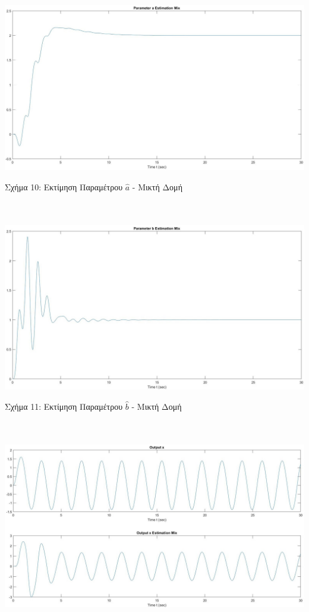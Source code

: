 \documentclass[12pt]{article}
\begin{document}
\\ \\
\includegraphics[width=\linewidth]{a_estim_mix_2.jpg}
\centerline{Σχήμα 10: Εκτίμηση Παραμέτρου $\hat{a}$ - Μικτή Δομή}
\\ \\
\includegraphics[width=\linewidth]{b_estim_mix_2.jpg}
\centerline{Σχήμα 11: Εκτίμηση Παραμέτρου $\hat{b}$ - Μικτή Δομή}
\\ \\
\includegraphics[width=\linewidth]{x_estim_mix_2.jpg}
\end{document}
